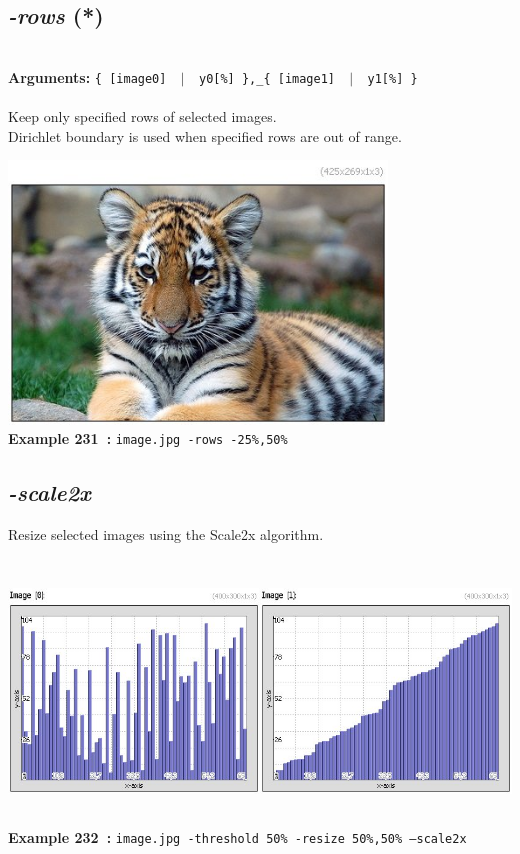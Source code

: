 \documentclass[a4paper,11pt,twoside]{book}
\begin{document}
\subsection{\emph{-rows} (*)}\vspace*{-0.5em}
~\\\textbf{Arguments: } 
{\small \texttt{\{ [image0] ~$|$~ y0[\%] \},\_\{ [image1] ~$|$~ y1[\%] \}}}\\~\\
Keep only specified rows of selected images.
~\\Dirichlet boundary is used when specified rows are out of range.
\begin{center}\includegraphics[keepaspectratio=true,height=7cm,width=\textwidth]{img/gmic_def231.jpg}\\
{\footnotesize \textbf{Example 231~:} \texttt{image.jpg -rows -25\%,50\%}}
\end{center}

\subsection{\emph{-scale2x} }\vspace*{-0.5em}
Resize selected images using the Scale2x algorithm.
\begin{center}\includegraphics[keepaspectratio=true,height=7cm,width=\textwidth]{img/gmic_def232.jpg}\\
{\footnotesize \textbf{Example 232~:} \texttt{image.jpg -threshold 50\% -resize 50\%,50\% --scale2x}}
\end{center}
\end{document}
